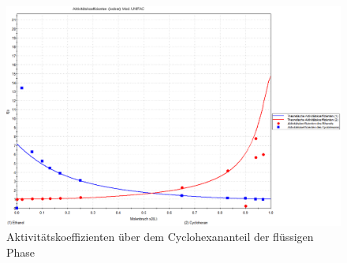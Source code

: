 \begin{figure}[h!]
	\centering
	\includegraphics[width=1.1\linewidth]{img/Aktiv}
	\caption{Aktivitätskoeffizienten über dem Cyclohexananteil der flüssigen Phase}
	\label{fig:Aktiv}
\end{figure}











